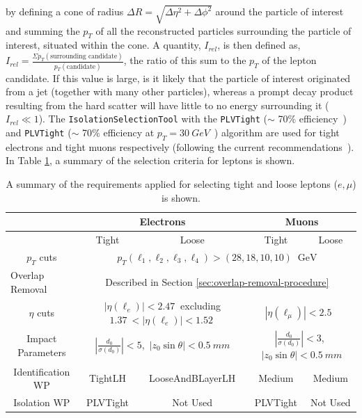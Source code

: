 by defining a cone of radius $\Delta R = \sqrt{\Delta \eta^{2} + \Delta \phi^{2}}$ around the particle of interest and summing the $p_{T}$ of all the reconstructed particles surrounding the particle of interest, situated within the cone. A quantity, $I_{rel}$, is then defined as, $I_{rel} = \frac{\Sigma p_{T}(\text{surrounding candidate})  }{p_{T}(\text{candidate})}$, the ratio of this sum to the $p_{T}$ of the lepton candidate. If this value is large, is it likely that the particle of interest originated from a jet (together with many other particles), whereas a prompt decay product resulting from the hard scatter will have little to no energy surrounding it ($I_{rel} \ll 1$). The \texttt{IsolationSelectionTool} with the \texttt{PLVTight} ($\sim$ 70$\%$ efficiency~\cite{elecIsolationEfficiency}) and \texttt{PLVTight} ($\sim$ 70$\%$ efficiency at $p_{T} = \SI{30}{GeV}$~\cite{muonIsolationEfficiency}) algorithm are used for tight electrons and tight muons respectively (following the current recommendations~\cite{recommendedIsolationWPs}). In Table \ref{tab:lepton-selection}, a summary of the selection criteria for leptons is shown.

\begin{table}[htbp]
	\centering
\small
\def\arraystretch{1.4}
	\begin{tabular}{c|cc|cc} 
		\toprule
		& \multicolumn{2}{c|}{Electrons }   & \multicolumn{2}{c}{Muons}       \\ \hline
		& Tight    & Loose    & Tight      & Loose        \\ 
		\hline
		$p_{T}$ cuts    & \multicolumn{4}{c}{$p_{T}(\ell_1,\ell_2,\ell_3,\ell_4) > (28,18,10,10)$ $\SI{}{\GeV}$}   \\
		\multicolumn{1}{l|}{Overlap Removal} &\multicolumn{4}{c}{Described in Section \ref{sec:overlap-removal-procedure}}\\  
		$\eta$ cuts       & \multicolumn{2}{c|}{$|\eta(\ell_e)| < \SI{2.47}{}$ excluding $\SI{1.37}{} < |\eta(\ell_e)| < \SI{1.52}{}$} & \multicolumn{2}{c}{$|\eta(\ell_\mu)| < \SI{2.5}{}$~}                                           \\
		\multicolumn{1}{c|}{Impact Parameters} & \multicolumn{2}{c|}{$|\frac{d_{0}}{\sigma(d_{0})}| < 5$,~$|z_{0}\sin{\theta}| < \SI{0.5}{mm}$}             & \multicolumn{2}{c}{$|\frac{d_{0}}{\sigma(d_{0})}| < 3$,~$|z_{0}\sin{\theta}| < \SI{0.5}{mm}$}  \\ 
		Identification WP  & TightLH  & LooseAndBLayerLH      & Medium   & Medium   \\
		Isolation WP & PLVTight & Not Used      & PLVTight  & Not Used  \\
		\bottomrule
	\end{tabular}
\caption{A summary of the requirements applied for selecting tight and loose leptons ($e,\mu$) is shown.}
\label{tab:lepton-selection}
\end{table}
